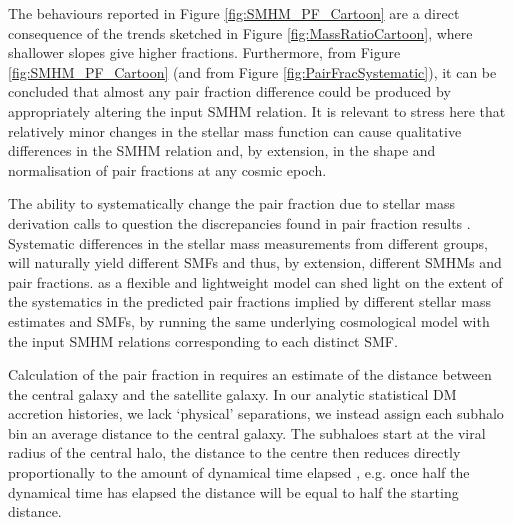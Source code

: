 The behaviours reported in Figure \ref{fig:SMHM_PF_Cartoon} are a direct consequence of the trends sketched in Figure \ref{fig:MassRatioCartoon}, where shallower slopes give higher fractions. 
Furthermore, from Figure \ref{fig:SMHM_PF_Cartoon} (and from Figure \ref{fig:PairFracSystematic}), it can be concluded that almost any pair fraction difference could be produced by appropriately altering the input SMHM relation. 
It is relevant to stress here that relatively minor changes in the stellar mass function can cause qualitative differences in the SMHM relation and, by extension, in the shape and normalisation of pair fractions at any cosmic epoch.

The ability to systematically change the pair fraction due to stellar mass derivation calls to question the discrepancies found in pair fraction results \citep[e.g.][]{Man2016RESOLVING03}. 
Systematic differences in the stellar mass measurements from different groups, will naturally yield different SMFs and thus, by extension, different SMHMs and pair fractions.  
\steel as a flexible and lightweight model can shed light on the extent of the systematics in the predicted pair fractions implied by different stellar mass estimates and SMFs, by running the same underlying cosmological model with the input SMHM relations corresponding to each distinct SMF.

Calculation of the pair fraction in \steel requires an estimate of the distance between the central galaxy and the satellite galaxy. In our analytic statistical DM accretion histories, we lack `physical' separations, we instead assign each subhalo bin an average distance to the central galaxy. 
The subhaloes start at the viral radius of the central halo, the distance to the centre then reduces directly proportionally to the amount of dynamical time elapsed \citep{Guo2011FromCosmology}, e.g. once half the dynamical time has elapsed the distance will be equal to half the starting distance.

